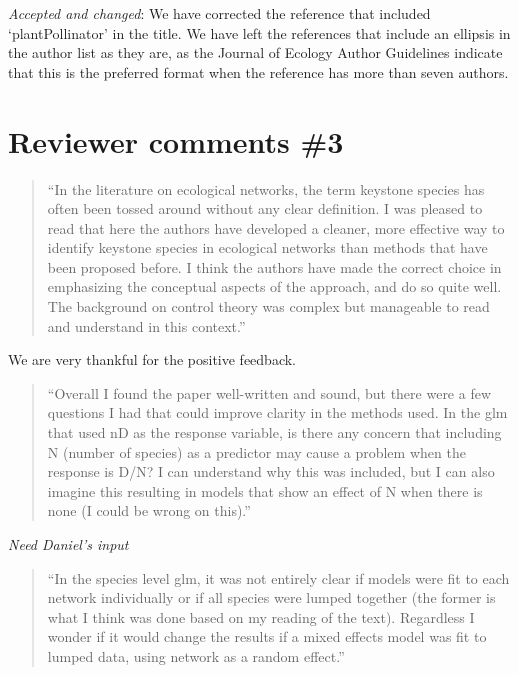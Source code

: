 \documentclass[a4paper]{artikel1}
\theoremstyle{definition}
\theoremstyle{definition}
\theoremstyle{definition}
\theoremstyle{remark}
\begin{document}
\emph{Accepted and changed}: We have corrected the reference that
included `plantPollinator' in the title. We have left the references
that include an ellipsis in the author list as they are, as the Journal
of Ecology Author Guidelines indicate that this is the preferred format
when the reference has more than seven authors.

\section{Reviewer comments \#3}\label{reviewer-comments-3}

\begin{quote}
``In the literature on ecological networks, the term keystone species
has often been tossed around without any clear definition. I was pleased
to read that here the authors have developed a cleaner, more effective
way to identify keystone species in ecological networks than methods
that have been proposed before. I think the authors have made the
correct choice in emphasizing the conceptual aspects of the approach,
and do so quite well. The background on control theory was complex but
manageable to read and understand in this context.''
\end{quote}

We are very thankful for the positive feedback.

\begin{quote}
``Overall I found the paper well-written and sound, but there were a few
questions I had that could improve clarity in the methods used. In the
glm that used nD as the response variable, is there any concern that
including N (number of species) as a predictor may cause a problem when
the response is D/N? I can understand why this was included, but I can
also imagine this resulting in models that show an effect of N when
there is none (I could be wrong on this).''
\end{quote}

\emph{Need Daniel's input}

\begin{quote}
``In the species level glm, it was not entirely clear if models were fit
to each network individually or if all species were lumped together (the
former is what I think was done based on my reading of the text).
Regardless I wonder if it would change the results if a mixed effects
model was fit to lumped data, using network as a random effect.''
\end{quote}
\end{document}
